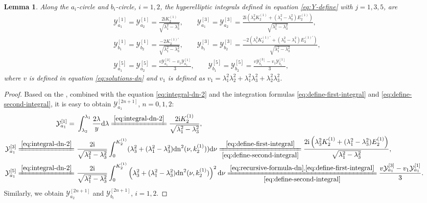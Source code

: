 \documentclass[11pt,reqno]{amsart}
\newcommand{\ii}{\mathrm{i}}
\newcommand{\dn}{\mathrm{dn}}
\newcommand{\dd}{\mathrm{d}}
\newtheorem{lemma}{Lemma}
\numberwithin{equation}{section}
\begin{document}
\begin{lemma}\label{lemma:dn-2-int}
	Along the $a_i$-circle and $b_i$-circle, $i=1,2$, the hyperelliptic integrals defined in equation \eqref{eq:Y-define} with $j=1,3,5$, are
	\begin{equation}\nonumber
		\begin{split}
			&\mathcal{Y}_{a_1}^{[1]}=\mathcal{Y}_{a_2}^{[1]}=\frac{2\ii K^{(1)}_2}{\sqrt{\lambda_1^2-\lambda_3^2}}, \qquad \mathcal{Y}_{a_1}^{[3]}=\mathcal{Y}_{a_2}^{[3]} =\frac{2\ii  \left(\lambda_3^2  K^{(1)}_2+(\lambda_1^2-\lambda_3^2) E^{(1)}_2\right)}{\sqrt{\lambda_1^2-\lambda_3^2}},\\
			&\mathcal{Y}_{b_1}^{[1]}=\mathcal{Y}_{b_2}^{[1]}=\frac{-2  K^{(1)\prime}_2}{\sqrt{\lambda_1^2-\lambda_3^2}},\qquad
			\mathcal{Y}_{b_1}^{[3]}=\mathcal{Y}_{b_2}^{[3]}=\frac{-2(\lambda_1^2  K^{(1)\prime}_2+(\lambda_3^2-\lambda_1^2) E^{(1)\prime}_2)}{\sqrt{\lambda_1^2-\lambda_3^2}},\\
			& \mathcal{Y}_{a_1}^{[5]}=\mathcal{Y}_{a_2}^{[5]} = \frac{v\mathcal{Y}_{a_1}^{[3]}-v_1\mathcal{Y}_{a_1}^{[1]}}{3}, \qquad \mathcal{Y}_{b_1}^{[5]}=\mathcal{Y}_{b_2}^{[5]} =\frac{v\mathcal{Y}_{b_1}^{[3]}-v_1\mathcal{Y}_{b_1}^{[1]}}{3},
		\end{split}
	\end{equation}
	where $v$ is defined in equation \eqref{eq:solutions-dn} and $v_1$ is defined as $v_1=\lambda_1^2\lambda_2^2+\lambda_1^2\lambda_3^2+\lambda_2^2\lambda_3^2$.
\end{lemma}
\begin{proof}
Based on the , combined with the equation \eqref{eq:integral-dn-2} and the integration formulas \eqref{eq:define-first-integral} and \eqref{eq:define-second-integral}, it is easy to obtain $\mathcal{Y}_{a_1}^{[2n+1]}$, $n=0,1,2$:
\begin{equation}\nonumber
	\begin{split}
	    \mathcal{Y}_{a_1}^{[1]}= &\ \int_{\lambda_2}^{\lambda_1}\frac{2\lambda}{y}\dd \lambda	\xlongequal{\eqref{eq:integral-dn-2}} \frac{2\ii K^{(1)}_2}{\sqrt{\lambda_1^2-\lambda_3^2}},\\
		\mathcal{Y}_{a_1}^{[3]}	\xlongequal{\eqref{eq:integral-dn-2}} &\ \frac{2\ii }{\sqrt{\lambda_1^2-\lambda_3^2}}\int_{0}^{   K^{(1)}_2}(\lambda_3^2+(\lambda_1^2-\lambda_3^2)\dn^2(\nu,  k^{(1)}_2)) \dd \nu\xlongequal[\eqref{eq:define-second-integral}]{\eqref{eq:define-first-integral}}\frac{2\ii  \left(\lambda_3^2  K^{(1)}_2+(\lambda_1^2-\lambda_3^2) E^{(1)}_2\right)}{\sqrt{\lambda_1^2-\lambda_3^2}}, \\
		\mathcal{Y}_{a_1}^{[5]}	\xlongequal{\eqref{eq:integral-dn-2}} &\ \frac{2\ii}{\sqrt{\lambda_1^2-\lambda_3^2}}\int_{0}^{   K^{(1)}_2}\left(\lambda_3^2+(\lambda_1^2-\lambda_3^2)\dn^2(\nu,  k^{(1)}_2)\right)^2 \dd \nu  \xlongequal[\eqref{eq:define-second-integral}]{\eqref{eq:recursive-formula-dn},\eqref{eq:define-first-integral}}  \frac{v\mathcal{Y}_{a_1}^{[3]}-v_1\mathcal{Y}_{a_1}^{[1]}}{3}.\\
	\end{split}
\end{equation}
Similarly, we obtain $\mathcal{Y}_{a_2}^{[2n+1]}$ and  $\mathcal{Y}_{b_i}^{[2n+1]}$, $i=1,2$.
\end{proof} 
\end{document}

